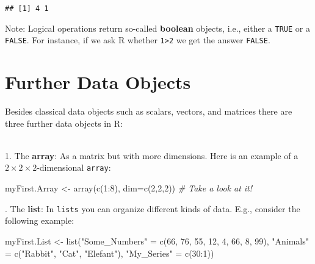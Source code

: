 \documentclass[
]{book}
\newenvironment{Shaded}{\begin{snugshade}}{\end{snugshade}}
\newcommand{\AttributeTok}[1]{\textcolor[rgb]{0.77,0.63,0.00}{#1}}
\newcommand{\CommentTok}[1]{\textcolor[rgb]{0.56,0.35,0.01}{\textit{#1}}}
\newcommand{\DecValTok}[1]{\textcolor[rgb]{0.00,0.00,0.81}{#1}}
\newcommand{\FunctionTok}[1]{\textcolor[rgb]{0.00,0.00,0.00}{#1}}
\newcommand{\NormalTok}[1]{#1}
\newcommand{\OtherTok}[1]{\textcolor[rgb]{0.56,0.35,0.01}{#1}}
\newcommand{\SpecialCharTok}[1]{\textcolor[rgb]{0.00,0.00,0.00}{#1}}
\newcommand{\StringTok}[1]{\textcolor[rgb]{0.31,0.60,0.02}{#1}}
\begin{document}
\begin{verbatim}
## [1] 4 1
\end{verbatim}

Note: Logical operations return so-called \textbf{boolean} objects, i.e., either a \texttt{TRUE} or a \texttt{FALSE}. For instance, if we ask R whether \texttt{1\textgreater{}2} we get the answer \texttt{FALSE}.

\hypertarget{further-data-objects}{%
\section{Further Data Objects}\label{further-data-objects}}

Besides classical data objects such as scalars, vectors, and matrices there are three further data objects in R:\\
\strut \\
1. The \textbf{array}: As a matrix but with more dimensions. Here is an example of a \(2\times 2\times 2\)-dimensional \texttt{array}:

\begin{Shaded}
\begin{Highlighting}[]
\NormalTok{myFirst.Array }\OtherTok{\textless{}{-}} \FunctionTok{array}\NormalTok{(}\FunctionTok{c}\NormalTok{(}\DecValTok{1}\SpecialCharTok{:}\DecValTok{8}\NormalTok{), }\AttributeTok{dim=}\FunctionTok{c}\NormalTok{(}\DecValTok{2}\NormalTok{,}\DecValTok{2}\NormalTok{,}\DecValTok{2}\NormalTok{)) }\CommentTok{\# Take a look at it!}
\end{Highlighting}
\end{Shaded}

\hfill\break
\hfill{}. The \textbf{list}: In \texttt{lists} you can organize different kinds of data. E.g., consider the following example:

\begin{Shaded}
\begin{Highlighting}[]
\NormalTok{myFirst.List }\OtherTok{\textless{}{-}} \FunctionTok{list}\NormalTok{(}\StringTok{"Some\_Numbers"} \OtherTok{=} \FunctionTok{c}\NormalTok{(}\DecValTok{66}\NormalTok{, }\DecValTok{76}\NormalTok{, }\DecValTok{55}\NormalTok{, }\DecValTok{12}\NormalTok{, }\DecValTok{4}\NormalTok{, }\DecValTok{66}\NormalTok{, }\DecValTok{8}\NormalTok{, }\DecValTok{99}\NormalTok{), }
                     \StringTok{"Animals"}      \OtherTok{=} \FunctionTok{c}\NormalTok{(}\StringTok{"Rabbit"}\NormalTok{, }\StringTok{"Cat"}\NormalTok{, }\StringTok{"Elefant"}\NormalTok{),}
                     \StringTok{"My\_Series"}    \OtherTok{=} \FunctionTok{c}\NormalTok{(}\DecValTok{30}\SpecialCharTok{:}\DecValTok{1}\NormalTok{)) }
\end{Highlighting}
\end{Shaded}
\end{document}
